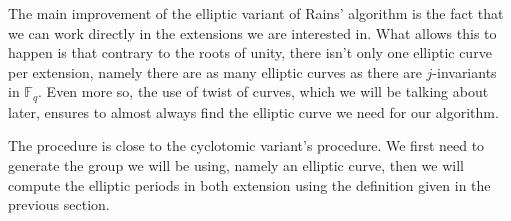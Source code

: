 \documentclass[12pt]{article}
\theoremstyle{plain}
\theoremstyle{definition}
\def\F{\ensuremath{\mathbb{F}}}
\newcounter{algorithm}
\begin{document}
The main improvement of the elliptic variant of Rains' algorithm is the fact
that we can work directly in the extensions we are interested in. What allows
this to happen is that contrary to the roots of unity, there isn't only one
elliptic curve per extension, namely there are as many elliptic curves as there
are $j$-invariants in $\F_q$. Even more so, the use of twist of curves, which we
will be talking about later, ensures to almost always find the elliptic curve we
need for our algorithm.\par
The procedure is close to the cyclotomic variant's procedure. We first need to
generate the group we will be using, namely an elliptic curve, then we will
compute the elliptic periods in both extension using the definition given in the
previous section.\\\par
\end{document}
